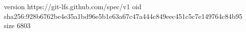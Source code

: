 version https://git-lfs.github.com/spec/v1
oid sha256:928b6762be4e35a1bd96e5b1e63a67c47a444c849eec451c5c7e149764c84b95
size 6803
